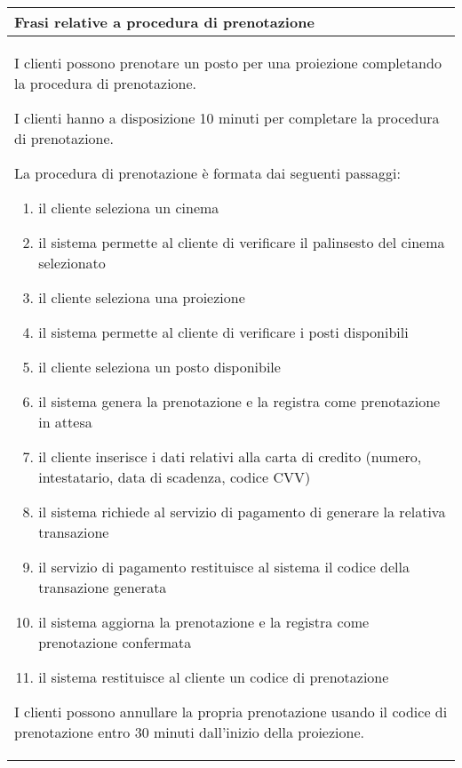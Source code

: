 \begin{tabularx}{\linewidth}{|X|}
      \hline
      \rowcolor{tblhdrcolor}
      \textbf{Frasi relative a procedura di prenotazione} \\\hline
      I clienti possono prenotare un posto per una proiezione
      completando la procedura di prenotazione.

      I clienti hanno a disposizione 10 minuti per completare la
      procedura di prenotazione.

      La procedura di prenotazione è formata dai seguenti passaggi:
      \begin{enumerate}
            \item il cliente seleziona un cinema
            \item il sistema permette al cliente di verificare
                  il palinsesto del cinema selezionato
            \item il cliente seleziona una proiezione
            \item il sistema permette al cliente di verificare
                  i posti disponibili
            \item il cliente seleziona un posto disponibile
            \item il sistema genera la prenotazione e la registra
                  come prenotazione in attesa
            \item il cliente inserisce i dati relativi alla carta
                  di credito (numero, intestatario, data di scadenza,
                  codice CVV)
            \item il sistema richiede al servizio di pagamento di
                  generare la relativa transazione
            \item il servizio di pagamento restituisce al sistema
                  il codice della transazione generata
            \item il sistema aggiorna la prenotazione e la registra
                  come prenotazione confermata
            \item il sistema restituisce al cliente un codice di
                  prenotazione
      \end{enumerate}

      I clienti possono annullare la propria prenotazione usando il
      codice di prenotazione entro 30 minuti dall'inizio della
      proiezione.
      \\ \hline
\end{tabularx}

